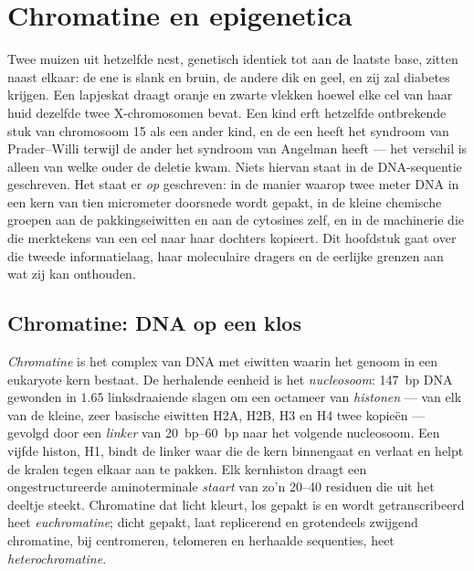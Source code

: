 \chapter{Chromatine en epigenetica}\label{ch:b3:chromatin-epigenetics}

Twee muizen uit hetzelfde nest, genetisch identiek tot aan de laatste
base, zitten naast elkaar: de ene is slank en bruin, de andere dik en
geel, en zij zal diabetes krijgen. Een lapjeskat draagt oranje en
zwarte vlekken hoewel elke cel van haar huid dezelfde twee
X-chromosomen bevat. Een kind erft hetzelfde ontbrekende stuk van
chromosoom 15 als een ander kind, en de een heeft het syndroom van
Prader--Willi terwijl de ander het syndroom van Angelman heeft --- het
verschil is alleen van welke ouder de deletie kwam. Niets hiervan
staat in de DNA-sequentie geschreven. Het staat er \emph{op}
geschreven: in de manier waarop twee meter DNA in een kern van tien
micrometer doorsnede wordt gepakt, in de kleine chemische groepen aan
de pakkingseiwitten en aan de cytosines zelf, en in de machinerie die
die merktekens van een cel naar haar dochters kopieert. Dit hoofdstuk
gaat over die tweede informatielaag, haar moleculaire dragers en de
eerlijke grenzen aan wat zij kan onthouden.

\section{Chromatine: DNA op een klos}

\begin{definition}\label{def:b3:chromatin-epigenetics:nucleosome}
\emph{Chromatine} is het complex van DNA met eiwitten waarin het
genoom in een eukaryote kern bestaat. De herhalende eenheid is het
\emph{nucleosoom}: \qty{147}{bp} DNA gewonden in $1.65$ linksdraaiende
slagen om een octameer van \emph{histonen} --- van elk van de kleine,
zeer basische eiwitten H2A, H2B, H3 en H4 twee kopieën --- gevolgd
door een \emph{linker} van \qtyrange{20}{60}{bp} naar het volgende
nucleosoom. Een vijfde histon, H1, bindt de linker waar die de kern
binnengaat en verlaat en helpt de kralen tegen elkaar aan te pakken.
Elk kernhiston draagt een ongestructureerde aminoterminale
\emph{staart} van zo'n \numrange{20}{40} residuen die uit het deeltje
steekt. Chromatine dat licht kleurt, los gepakt is en wordt
getranscribeerd heet \emph{euchromatine}; dicht gepakt, laat
replicerend en grotendeels zwijgend chromatine, bij centromeren,
telomeren en herhaalde sequenties, heet \emph{heterochromatine}.
\end{definition}

